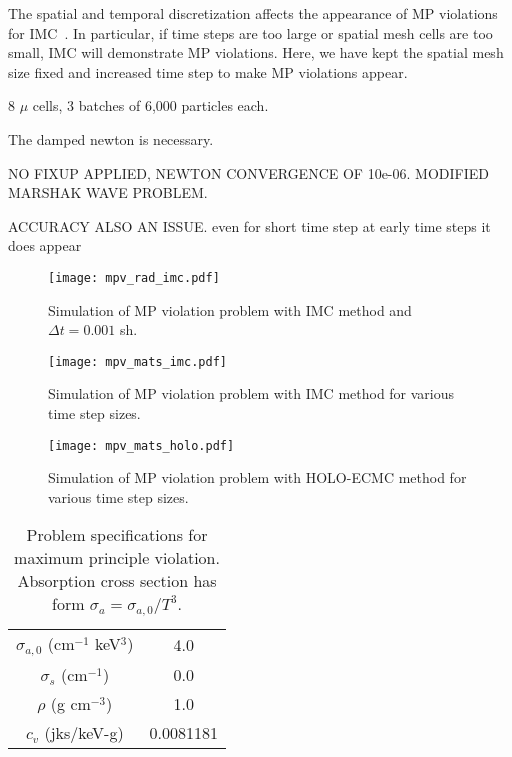 The spatial and temporal discretization affects the appearance of MP violations for
IMC~\cite{wollaber2013discrete}. In particular, if time steps are too large or spatial
mesh cells are too small, IMC will demonstrate MP violations.  Here, we have kept the
spatial mesh size fixed and increased time step to make MP violations appear.

8 $\mu$ cells, 3 batches of 6,000 particles each.


The damped newton is necessary.

NO FIXUP APPLIED, NEWTON CONVERGENCE OF 10e-06.  MODIFIED MARSHAK WAVE PROBLEM.

ACCURACY ALSO AN ISSUE.  even for short time step at early time steps it does appear

\begin{figure}[H]
    \centering
    \texttt{[image: mpv\_rad\_imc.pdf]}
    \caption{\label{fig:imc_mpvrad}Simulation of MP violation problem with IMC method and $\Delta t = 0.001$ sh.}
\end{figure}

\begin{figure}[H]
    \centering
    \texttt{[image: mpv\_mats\_imc.pdf]}
    \caption{\label{fig:imc_mpv}Simulation of MP violation problem with IMC method for various time step
    sizes.}
\end{figure}

\begin{figure}[H]
    \centering
    \texttt{[image: mpv\_mats\_holo.pdf]}
    \caption{\label{fig:holo_mpv}Simulation of MP violation problem with HOLO-ECMC method for various time step
    sizes.}
\end{figure}



\begin{table}[H]
        \caption{\label{tab:mpv_prob}Problem specifications for maximum principle
        violation. Absorption cross section has form $\sigma_a = \sigma_{a,0}/T^3$.}
\centering
        \begin{tabular}{|c|c|} \hline
            $\sigma_{a,0}$ (cm$^{-1}$ keV$^3$)  & 4.0  \\ 
            $\sigma_s$ (cm$^{-1}$) & 0.0 \\
            $\rho$ (g cm$^{-3}$) & 1.0  \\
            $c_v$ (jks/keV-g) & 0.0081181  \\ \hline
        \end{tabular}
\end{table}



